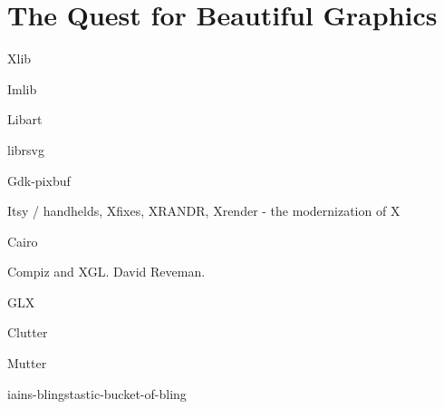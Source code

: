 \chapter{The Quest for Beautiful Graphics}

Xlib

Imlib

Libart

librsvg

Gdk-pixbuf

Itsy / handhelds, Xfixes, XRANDR, Xrender - the modernization of X

Cairo

Compiz and XGL.  David Reveman.

GLX

Clutter

Mutter

iains-blingstastic-bucket-of-bling
